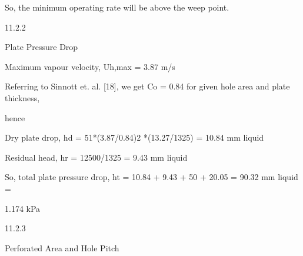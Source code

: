 \documentclass[a4paper,portrait,12pt]{article}
\begin{document}
\begin{flushleft}
So, the minimum operating rate will be above the weep point.
\end{flushleft}





11.2.2





\begin{flushleft}
Plate Pressure Drop
\end{flushleft}





\begin{flushleft}
Maximum vapour velocity, Uh,max = 3.87 m/s
\end{flushleft}


\begin{flushleft}
Referring to Sinnott et. al. [18], we get Co = 0.84 for given hole area and plate thickness,
\end{flushleft}


\begin{flushleft}
hence
\end{flushleft}


\begin{flushleft}
Dry plate drop, hd = 51*(3.87/0.84)2 *(13.27/1325) = 10.84 mm liquid
\end{flushleft}


\begin{flushleft}
Residual head, hr = 12500/1325 = 9.43 mm liquid
\end{flushleft}





\begin{flushleft}
So, total plate pressure drop, ht = 10.84 + 9.43 + 50 + 20.05 = 90.32 mm liquid =
\end{flushleft}


\begin{flushleft}
1.174 kPa
\end{flushleft}





11.2.3





\begin{flushleft}
Perforated Area and Hole Pitch
\end{flushleft}
\end{document}
